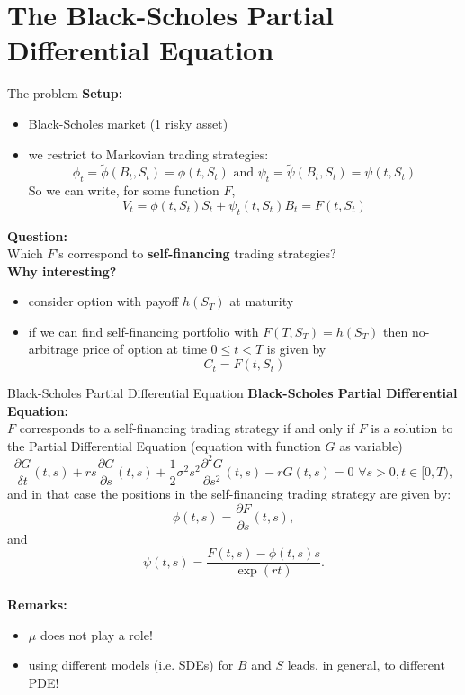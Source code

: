 \documentclass[pdf, handout]{beamer}
\begin{document}
\section[toc=Black-Scholes PDE]{The Black-Scholes Partial Differential Equation}

\begin{frame}{The problem}
\textbf{Setup:}
\begin{itemize}
\item Black-Scholes market (1 risky asset)
\item we restrict to
Markovian trading strategies:
\[
\phi_t=\tilde\phi(B_t, S_t)= \phi(t,S_t) \text{ and } \psi_t=\tilde\psi(B_t, S_t)
=\psi (t, S_t)
\]
So we can write, for some function $F$,
\[
 V_t=\phi(t, S_t) S_t + \psi_t(t, S_t) B_t=F(t, S_t)
\]
\end{itemize}
\textbf{Question:} \\
Which $F$'s correspond to \textbf{self-financing} trading strategies?
\\ \vspace{.25cm}
\textbf{Why interesting?}
\begin{itemize}
\item consider option with payoff $h(S_T)$ at maturity
\item if we can find self-financing portfolio with $F(T, S_T)= h(S_T)$ then
no-arbitrage price of option at time $0\leq t <T$ is given by
\[
C_t=F(t, S_t)
\]
\end{itemize}
\end{frame}

\begin{frame}{Black-Scholes Partial Differential Equation}
\textbf{Black-Scholes Partial Differential Equation:} \\
$F$ corresponds to a self-financing trading strategy if and only if $F$ is a solution to the Partial Differential Equation (equation with function $G$ as variable)
\[
\frac{\partial G}{\delta t}(t, s) + r s \frac{\partial G}{\partial
s}(t, s) + \frac{1}{2}\sigma^2 s^2 \frac{\partial^2 G}{\partial
s^2}(t,s) -r G(t,s )=0\,\, \forall s>0, t\in[0, T),
\]
and in that case the positions in the self-financing trading strategy are given by:
\[
\phi(t,s)=\frac{\partial F}{\partial s}(t, s),
\]
and
\[
\psi(t,s)=\frac{F(t,s)-\phi(t,s) s}{\exp(rt)}.
\]
\\ \vspace{.3cm}
\textbf{Remarks:}
\begin{itemize}
\item  $\mu$ does not play a role!
\item using different models (i.e. SDEs)
for $B$ and $S$ leads, in general, to
different PDE!
\end{itemize}
\end{frame}
\end{document}
